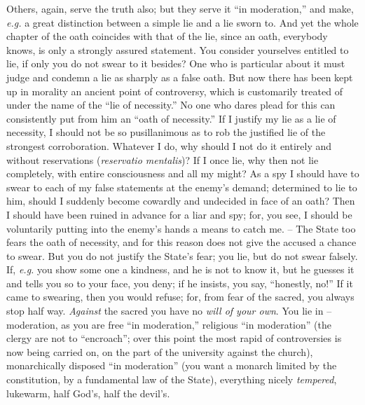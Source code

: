 \documentclass[12pt,a4paper]{book}
\begin{document}
Others, again, serve the truth also; but they serve it ``in moderation,'' 
and make, \textit{e.g.} a great distinction between a simple lie and a lie 
sworn to. And yet the whole chapter of the oath coincides with that of the 
lie, since an oath, everybody knows, is only a strongly assured statement. You 
consider yourselves entitled to lie, if only you do not swear to it besides? 
One who is particular about it must judge and condemn a lie as sharply as a 
false oath. But now there has been kept up in morality an ancient point of 
controversy, which is customarily treated of under the name of the ``lie of 
necessity.'' No one who dares plead for this can consistently put from him an 
``oath of necessity.'' If I justify my lie as a lie of necessity, I should 
not be so pusillanimous as to rob the justified lie of the strongest 
corroboration. Whatever I do, why should I not do it entirely and without 
reservations (\textit{reservatio mentalis})? If I once lie, why then not lie 
completely, with entire consciousness and all my might? As a spy I should have 
to swear to each of my false statements at the enemy's demand; determined to 
lie to him, should I suddenly become cowardly and undecided in face of an 
oath? Then I should have been ruined in advance for a liar and spy; for, you 
see, I should be voluntarily putting into the enemy's hands a means to catch 
me. -- The State too fears the oath of necessity, and for this reason does not 
give the accused a chance to swear. But you do not justify the State's fear; 
you lie, but do not swear falsely. If, \textit{e.g.} you show some one a 
kindness, and he is not to know it, but he guesses it and tells you so to your 
face, you deny; if he insists, you say, ``honestly, no!'' If it came to 
swearing, then you would refuse; for, from fear of the sacred, you always stop 
half way. \textit{Against} the sacred you have no \textit{will of your own}. 
You lie in -- moderation, as you are free ``in moderation,'' religious ``in 
moderation'' (the clergy are not to ``encroach''; over this point the most 
rapid of controversies is now being carried on, on the part of the university 
against the church), monarchically disposed ``in moderation'' (you want a 
monarch limited by the constitution, by a fundamental law of the State), 
everything nicely \textit{tempered}, lukewarm, half God's, half the devil's.
\end{document}
